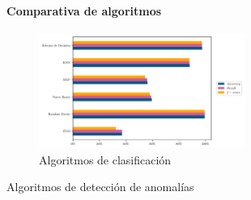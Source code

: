 \begin{frame}
\frametitle{\secname} %
\framesubtitle{Comparativa de algoritmos} %
\rmfamily %
\color{black} %
\begin{figure}
    \centering
    \includegraphics[width=0.6\textwidth]{../Python/plots/parallel/model_results.pdf}
    \caption{Algoritmos de clasificación}
\end{figure} 
\vspace{-1cm}
\begin{table}
    \centering
    \resizebox{0.5\textwidth}{!}{
        
    }
    \caption{Algoritmos de detección de anomalías}
\end{table}
\end{frame}


